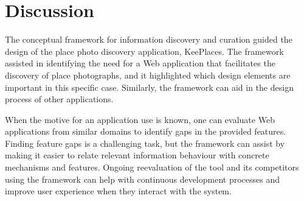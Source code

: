 {\section{Discussion}
The conceptual framework for information discovery and curation guided the design of the place photo discovery application, KeePlaces. The framework assisted in identifying the need for a Web application that facilitates the discovery of place photographs, and it highlighted which design elements are important in this specific case. Similarly, the framework can aid in the design process of other applications. 

When the motive for an application use is known, one can evaluate Web applications from similar domains to identify gaps in the provided features. Finding feature gaps is a challenging task, but the framework can assist by making it easier to relate relevant information behaviour with concrete mechanisms and features. Ongoing reevaluation of the tool and its competitors using the framework can help with continuous development processes and improve user experience when they interact with the system.
} %




